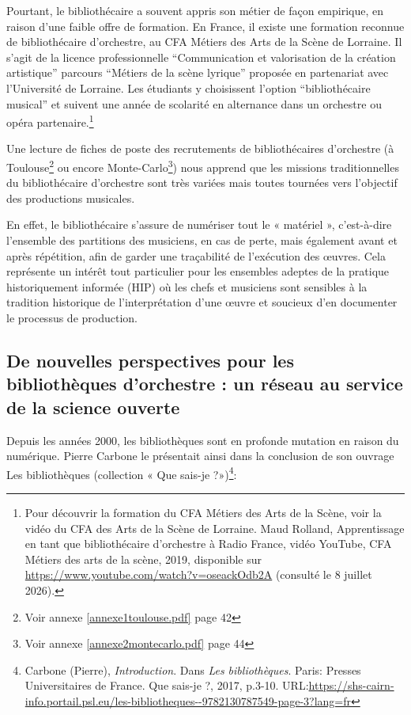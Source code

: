 Pourtant, le bibliothécaire a souvent appris son métier de façon empirique, en raison d'une faible offre de formation. 
En France, il existe une formation reconnue de bibliothécaire d'orchestre, au CFA Métiers des Arts de la Scène de Lorraine. Il s'agit de la licence professionnelle \enquote{Communication et valorisation de la création artistique} parcours \enquote{Métiers de la scène lyrique} proposée en partenariat avec l'Université de Lorraine.  Les étudiants y choisissent l'option \enquote{bibliothécaire musical} et suivent une année de scolarité en alternance dans un orchestre ou opéra partenaire.\footnote{Pour découvrir la formation du CFA Métiers des Arts de la Scène, voir la vidéo du CFA des Arts de la Scène de Lorraine. Maud Rolland, Apprentissage en tant que bibliothécaire d'orchestre à Radio France, vidéo YouTube, CFA Métiers des arts de la scène, 2019, disponible sur \url{https://www.youtube.com/watch?v=oseackOdb2A} (consulté le 8 juillet 2026).}

Une lecture de fiches de poste des recrutements de bibliothécaires d'orchestre (à Toulouse\footnote{Voir annexe \ref{annexe1toulouse.pdf} page 42}%
ou encore Monte-Carlo\footnote{Voir annexe \ref{annexe2montecarlo.pdf} page 44}) nous apprend que les missions traditionnelles du bibliothécaire d'orchestre sont très variées mais toutes tournées vers l'objectif des productions musicales.

En effet, le bibliothécaire s'assure de numériser tout le « matériel », c'est-à-dire l'ensemble des partitions des musiciens, en cas de perte, mais également avant et après répétition, afin de garder une traçabilité de l'exécution des œuvres. Cela représente un intérêt tout particulier pour les ensembles adeptes de la pratique historiquement informée (HIP) où les chefs et musiciens sont sensibles à la tradition historique de l'interprétation d'une œuvre et soucieux d'en documenter le processus de production.

\subsection*{De nouvelles perspectives pour les bibliothèques d'orchestre :  un réseau au service de la science ouverte}

Depuis les années 2000, les bibliothèques sont en profonde mutation en raison du numérique. 
Pierre Carbone le présentait ainsi dans la conclusion de son ouvrage Les bibliothèques (collection « Que sais-je ?»)\footnote{Carbone (Pierre), \textit{Introduction}. Dans \textit{Les bibliothèques}. Paris: Presses Universitaires de France. Que sais-je ?, 2017, p.3-10. URL:\url{https://shs-cairn-info.portail.psl.eu/les-bibliotheques--9782130787549-page-3?lang=fr}}:

